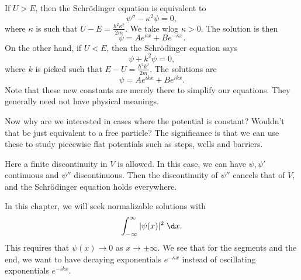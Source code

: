 \documentclass[a4paper]{article}
\begin{document}
If $U > E$, then the Schr\"odinger equation is equivalent to
\[
  \psi'' - \kappa^2 \psi = 0,
\]
where $\kappa$ is such that $U - E = \frac{\hbar^2 \kappa^2}{2m}$. We take wlog $\kappa > 0$. The solution is then
\[
  \psi = Ae^{\kappa x} + Be^{-\kappa x}.
\]
On the other hand, if $U < E$, then the Schr\"odinger equation says
\[
  \psi + k^2 \psi = 0,
\]
where $k$ is picked such that $E - U = \frac{\hbar^2 k^2}{2m}$. The solutions are
\[
  \psi = Ae^{ikx} + Be^{ikx}.
\]
Note that these new constants are merely there to simplify our equations. They generally need not have physical meanings.

Now why are we interested in cases where the potential is constant? Wouldn't that be just equivalent to a free particle? The significance is that we can use these to study piecewise flat potentials such as steps, wells and barriers.
\begin{center}
\end{center}
Here a finite discontinuity in $V$ is allowed. In this case, we can have $\psi, \psi'$ continuous and $\psi''$ discontinuous. Then the discontinuity of $\psi''$ cancels that of $V$, and the Schr\"odinger equation holds everywhere.

In this chapter, we will seek normalizable solutions with
\[
  \int_{-\infty}^\infty |\psi(x)|^2 \;\d x.
\]
This requires that $\psi(x) \to 0$ as $x \to \pm\infty$. We see that for the segments and the end, we want to have decaying exponentials $e^{-\kappa x}$ instead of oscillating exponentials $e^{-ikx}$.
\end{document}

